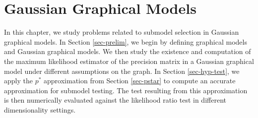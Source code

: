 \section{Gaussian Graphical Models}

In this chapter, we study problems related to submodel selection in Gaussian graphical models. In Section \ref{sec-prelim}, we begin by defining graphical models and Gaussian graphical models. We then study the existence and computation of the maximum likelihood estimator of the precision matrix in a Gaussian graphical model under different assumptions on the graph. In Section \ref{sec-hyp-test}, we apply the $p^*$ approximation from Section \ref{sec-pstar} to compute an accurate approximation for submodel testing. The test resulting from this approximation is then numerically evaluated against the likelihood ratio test in different dimensionality settings.







